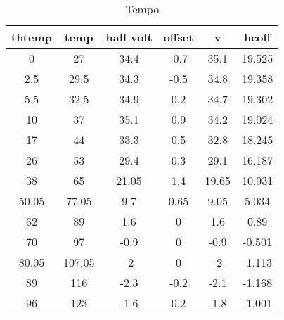 \begin{table}[H]
\centering
\caption{Tempo}
\label{tab:temp}
\begin{tabular}{|c|c|c|c|c|c|}
\hline
thtemp & temp   & hall volt & offset & v     & hcoff  \\ \hline
0       & 27     & 34.4      & -0.7    & 35.1  & 19.525 \\ \hline
2.5     & 29.5   & 34.3      & -0.5    & 34.8  & 19.358 \\ \hline
5.5     & 32.5   & 34.9      & 0.2     & 34.7  & 19.302 \\ \hline
10      & 37     & 35.1      & 0.9     & 34.2  & 19.024 \\ \hline
17      & 44     & 33.3      & 0.5     & 32.8  & 18.245 \\ \hline
26      & 53     & 29.4      & 0.3     & 29.1  & 16.187 \\ \hline
38      & 65     & 21.05     & 1.4     & 19.65 & 10.931 \\ \hline
50.05   & 77.05  & 9.7       & 0.65    & 9.05  & 5.034  \\ \hline
62      & 89     & 1.6       & 0       & 1.6   & 0.89   \\ \hline
70      & 97     & -0.9      & 0       & -0.9  & -0.501 \\ \hline
80.05   & 107.05 & -2        & 0       & -2    & -1.113 \\ \hline
89      & 116    & -2.3      & -0.2    & -2.1  & -1.168 \\ \hline
96      & 123    & -1.6      & 0.2     & -1.8  & -1.001 \\ \hline
\end{tabular}
\end{table}
